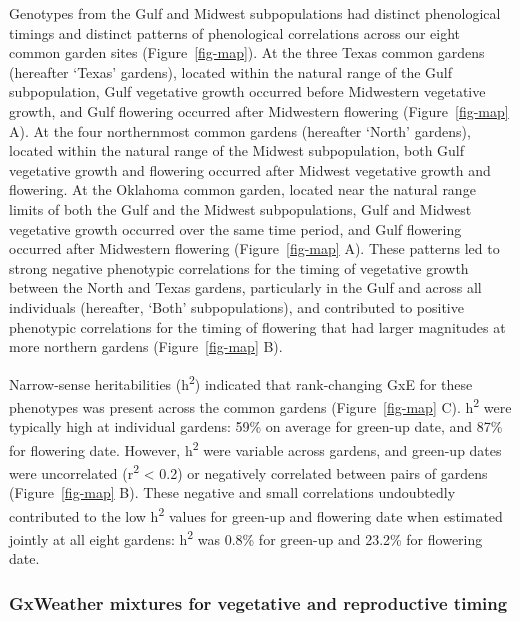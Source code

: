 \documentclass[
  9pt,
  twocolumn,
  twoside]{pnas-new}
\begin{document}
Genotypes from the Gulf and Midwest subpopulations had distinct
phenological timings and distinct patterns of phenological correlations
across our eight common garden sites (Figure~\ref{fig-map}). At the
three Texas common gardens (hereafter `Texas' gardens), located within
the natural range of the Gulf subpopulation, Gulf vegetative growth
occurred before Midwestern vegetative growth, and Gulf flowering
occurred after Midwestern flowering (Figure~\ref{fig-map} A). At the
four northernmost common gardens (hereafter `North' gardens), located
within the natural range of the Midwest subpopulation, both Gulf
vegetative growth and flowering occurred after Midwest vegetative growth
and flowering. At the Oklahoma common garden, located near the natural
range limits of both the Gulf and the Midwest subpopulations, Gulf and
Midwest vegetative growth occurred over the same time period, and Gulf
flowering occurred after Midwestern flowering (Figure~\ref{fig-map} A).
These patterns led to strong negative phenotypic correlations for the
timing of vegetative growth between the North and Texas gardens,
particularly in the Gulf and across all individuals (hereafter, `Both'
subpopulations), and contributed to positive phenotypic correlations for
the timing of flowering that had larger magnitudes at more northern
gardens (Figure~\ref{fig-map} B).

Narrow-sense heritabilities (h\textsuperscript{2}) indicated that
rank-changing GxE for these phenotypes was present across the common
gardens (Figure~\ref{fig-map} C). h\textsuperscript{2} were typically
high at individual gardens: 59\% on average for green-up date, and 87\%
for flowering date. However, h\textsuperscript{2} were variable across
gardens, and green-up dates were uncorrelated (r\textsuperscript{2}
\textless{} 0.2) or negatively correlated between pairs of gardens
(Figure~\ref{fig-map} B). These negative and small correlations
undoubtedly contributed to the low h\textsuperscript{2} values for
green-up and flowering date when estimated jointly at all eight gardens:
h\textsuperscript{2} was 0.8\% for green-up and 23.2\% for flowering
date.

\subsubsection{GxWeather mixtures for vegetative and reproductive
timing}\label{gxweather-mixtures-for-vegetative-and-reproductive-timing}
\end{document}
